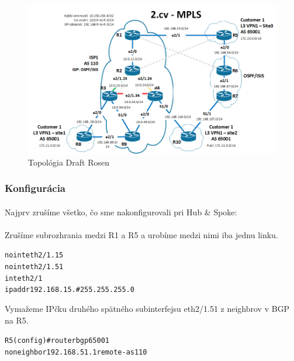 \documentclass[12pt,twoside,a4paper]{report}
\begin{document}
\begin{figure}[!htbp]
\centering
\includegraphics[width=14cm,keepaspectratio]{mpls_l3vpn_topo}
\caption{Topológia Draft Rosen}
\label{fig:mpls_l3vpn_draft_rosen_topo}
\end{figure}

\subsubsection{Konfigurácia}
\paragraph{}
Najprv zrušíme všetko, čo sme nakonfigurovali pri Hub \& Spoke:

\paragraph{}
Zrušíme subrozhrania medzi R1 a R5 a urobíme medzi nimi iba jednu linku.
\noindent
{\selectfont
\begin{small}
\begin{alltt}
no int eth2/1.15
no int eth2/1.51
int eth2/1
ip addr 192.168.15.# 255.255.255.0
\end{alltt}
\end{small}
}

Vymažeme IPčku druhého spätného subinterfejsu eth2/1.51  z neighbrov v BGP na R5.

\noindent
{\selectfont
\begin{small}
\begin{alltt}
R5(config)#router bgp 65001
  no neighbor 192.168.51.1 remote-as 110
\end{alltt}
\end{small}
}
\end{document}
